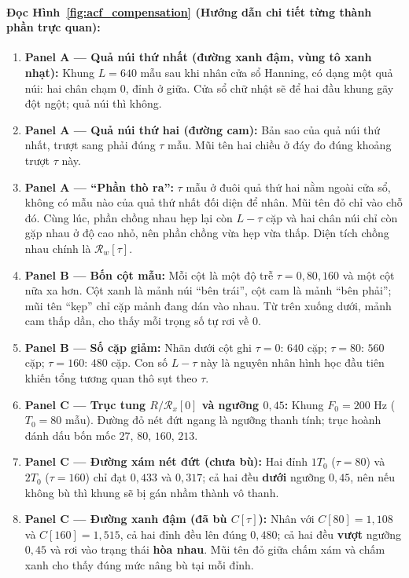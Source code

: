 \documentclass[11pt,a4paper]{article}
\begin{document}
\paragraph{Đọc Hình~\ref{fig:acf_compensation} (Hướng dẫn chi tiết từng thành phần trực quan):}
\begin{enumerate}
    \setlength{\itemsep}{1.5pt}
    \item \textbf{Panel A --- Quả núi thứ nhất (đường xanh đậm, vùng tô xanh nhạt):} Khung $L = 640$ mẫu sau khi nhân cửa sổ Hanning, có dạng một quả núi: hai chân chạm $0$, đỉnh ở giữa. Cửa sổ chữ nhật sẽ để hai đầu khung gãy đột ngột; quả núi thì không.
    \item \textbf{Panel A --- Quả núi thứ hai (đường cam):} Bản sao của quả núi thứ nhất, trượt sang phải đúng $\tau$ mẫu. Mũi tên hai chiều ở đáy đo đúng khoảng trượt $\tau$ này.
    \item \textbf{Panel A --- ``Phần thò ra'':} $\tau$ mẫu ở đuôi quả thứ hai nằm ngoài cửa sổ, không có mẫu nào của quả thứ nhất đối diện để nhân. Mũi tên đỏ chỉ vào chỗ đó. Cùng lúc, phần chồng nhau hẹp lại còn $L - \tau$ cặp và hai chân núi chỉ còn gặp nhau ở độ cao nhỏ, nên phần chồng vừa hẹp vừa thấp. Diện tích chồng nhau chính là $\mathcal{R}_w[\tau]$.
    \item \textbf{Panel B --- Bốn cột mẫu:} Mỗi cột là một độ trễ $\tau = 0, 80, 160$ và một cột nữa xa hơn. Cột xanh là mảnh núi ``bên trái'', cột cam là mảnh ``bên phải''; mũi tên ``kẹp'' chỉ cặp mảnh đang dán vào nhau. Từ trên xuống dưới, mảnh cam thấp dần, cho thấy mỗi trọng số tự rơi về $0$.
    \item \textbf{Panel B --- Số cặp giảm:} Nhãn dưới cột ghi $\tau = 0$: $640$ cặp; $\tau = 80$: $560$ cặp; $\tau = 160$: $480$ cặp. Con số $L - \tau$ này là nguyên nhân hình học đầu tiên khiến tổng tương quan thô sụt theo $\tau$.
    \item \textbf{Panel C --- Trục tung $R/\mathcal{R}_x[0]$ và ngưỡng $0{,}45$:} Khung $F_0 = 200\text{ Hz}$ ($T_0 = 80$ mẫu). Đường đỏ nét đứt ngang là ngưỡng thanh tính; trục hoành đánh dấu bốn mốc $27$, $80$, $160$, $213$.
    \item \textbf{Panel C --- Đường xám nét đứt (chưa bù):} Hai đỉnh $1T_0$ ($\tau = 80$) và $2T_0$ ($\tau = 160$) chỉ đạt $0{,}433$ và $0{,}317$; cả hai đều \textbf{dưới} ngưỡng $0{,}45$, nên nếu không bù thì khung sẽ bị gán nhầm thành vô thanh.
    \item \textbf{Panel C --- Đường xanh đậm (đã bù $C[\tau]$):} Nhân với $C[80] = 1{,}108$ và $C[160] = 1{,}515$, cả hai đỉnh đều lên đúng $0{,}480$; cả hai đều \textbf{vượt} ngưỡng $0{,}45$ và rơi vào trạng thái \textbf{hòa nhau}. Mũi tên đỏ giữa chấm xám và chấm xanh cho thấy đúng mức nâng bù tại mỗi đỉnh.

\end{enumerate}
\end{document}
